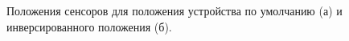 \documentclass[12pt,a4paper,oneside,fleqn,leqno]{article}
\begin{document}
\begin{figure}[h!]
\begin{minipage}[h!]{0.48\linewidth}
\end{minipage}
\hfill
\begin{minipage}[h!]{0.5\linewidth}
\end{minipage}
\caption{Положения сенсоров для положения устройства по умолчанию (а) и инверсированного положения (б).}
\label{position}
\end{figure}
\end{document}
